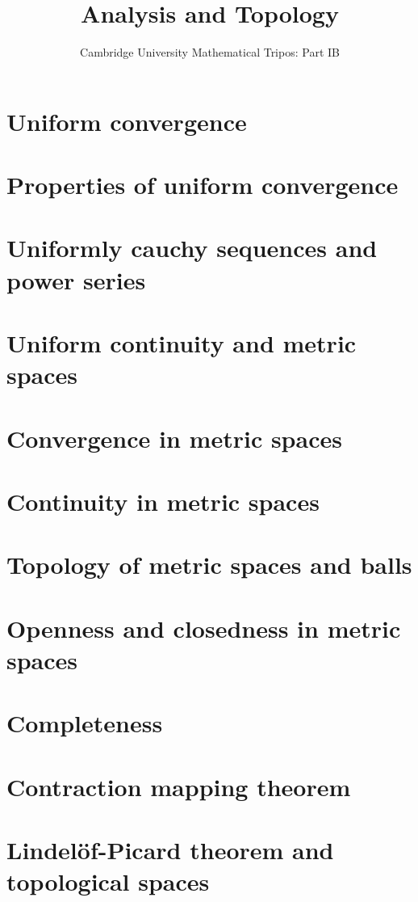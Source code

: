 \documentclass{article}
\title{Analysis and Topology}
\author{Cambridge University Mathematical Tripos: Part IB}
\begin{document}
\maketitle

\tableofcontentsnewpage{}

\section{Uniform convergence}

\section{Properties of uniform convergence}

\section{Uniformly cauchy sequences and power series}

\section{Uniform continuity and metric spaces}

\section{Convergence in metric spaces}

\section{Continuity in metric spaces}

\section{Topology of metric spaces and balls}

\section{Openness and closedness in metric spaces}

\section{Completeness}

\section{Contraction mapping theorem}

\section{Lindel\"of-Picard theorem and topological spaces}

\end{document}
